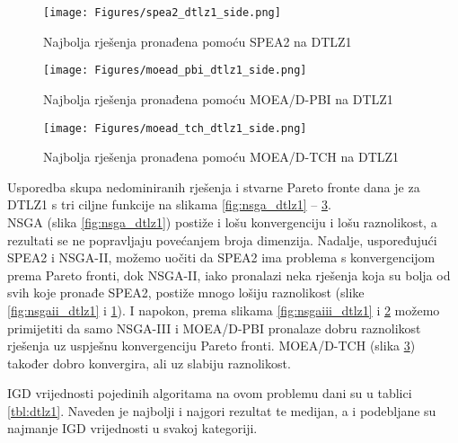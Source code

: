 \documentclass[times, utf8, zavrsni, numeric]{fer}
\begin{document}
\begin{figure}[htb]
\centering
\texttt{[image: Figures/spea2\_dtlz1\_side.png]}
\caption{Najbolja rješenja pronađena pomoću SPEA2 na DTLZ1}
\label{fig:spea2_dtlz1}
\end{figure}

\begin{figure}[htb]
\centering
\texttt{[image: Figures/moead\_pbi\_dtlz1\_side.png]}
\caption{Najbolja rješenja pronađena pomoću MOEA/D-PBI na DTLZ1}
\label{fig:moeadpbi_dtlz1}
\end{figure}

\begin{figure}[htb]
\centering
\texttt{[image: Figures/moead\_tch\_dtlz1\_side.png]}
\caption{Najbolja rješenja pronađena pomoću MOEA/D-TCH na DTLZ1}
\label{fig:moeadtch_dtlz1}
\end{figure} 
Usporedba skupa nedominiranih rješenja i stvarne Pareto fronte dana je za DTLZ1 s tri ciljne funkcije na slikama \ref{fig:nsga_dtlz1} -- \ref{fig:moeadtch_dtlz1}. \\ 
NSGA (slika \ref{fig:nsga_dtlz1}) postiže i lošu konvergenciju i lošu raznolikost, a rezultati se ne popravljaju povećanjem broja dimenzija. Nadalje, uspoređujući SPEA2 i NSGA-II, možemo uočiti da SPEA2 ima problema s konvergencijom prema Pareto fronti, dok NSGA-II, iako pronalazi neka rješenja koja su bolja od svih koje pronađe SPEA2, postiže mnogo lošiju raznolikost (slike \ref{fig:nsgaii_dtlz1} i \ref{fig:spea2_dtlz1}). I napokon, prema slikama \ref{fig:nsgaiii_dtlz1} i \ref{fig:moeadpbi_dtlz1} možemo primijetiti da samo NSGA-III i MOEA/D-PBI pronalaze dobru raznolikost rješenja uz uspješnu konvergenciju Pareto fronti. MOEA/D-TCH (slika \ref{fig:moeadtch_dtlz1}) također dobro konvergira, ali uz slabiju raznolikost.

IGD vrijednosti pojedinih algoritama na ovom problemu dani su  u tablici \ref{tbl:dtlz1}. Naveden je najbolji i najgori rezultat te medijan, a i podebljane su najmanje IGD vrijednosti u svakoj kategoriji. 
\end{document}
